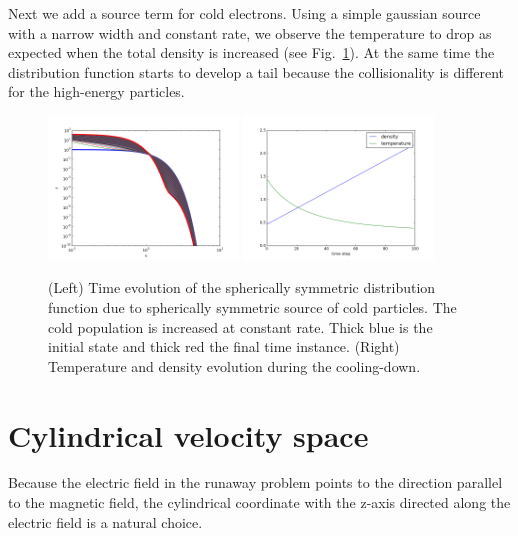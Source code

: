 \documentclass[preprint]{revtex4}
\begin{document}
Next we add a source term for cold electrons. Using a simple gaussian source with a narrow width and constant rate, we observe the temperature to drop as expected when the total density is increased (see Fig.~\ref{fig:spherical_cooling_test}). At the same time the distribution function starts to develop a tail because the collisionality is different for the high-energy particles.
\begin{figure}[!h]
\includegraphics[width=0.45\textwidth]{fig/f_cooling_down.png}
\includegraphics[width=0.45\textwidth]{fig/spherically_symmetric_temperature_relaxation.png}
\caption{(Left) Time evolution of the spherically symmetric distribution function due to spherically symmetric source of cold particles. The cold population is increased at constant rate. Thick blue is the initial state and thick red the final time instance. (Right) Temperature and density evolution during the cooling-down.}
\label{fig:spherical_cooling_test}
\end{figure}


\section{Cylindrical velocity space}
Because the electric field in the runaway problem points to the direction parallel to the magnetic field, the cylindrical coordinate with the z-axis directed along the electric field is a natural choice. 
\end{document}
